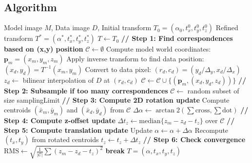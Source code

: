 \documentclass[11pt,a4paper]{article}
\begin{document}
\subsection{Algorithm}

\begin{algorithm}[H]
\caption{2.5D Iterative Refinement}
\begin{algorithmic}[1]
\Require Model image $M$, Data image $D$, Initial transform $T_0 = (\alpha_0, t_x^0, t_y^0, t_z^0)$
\Ensure Refined transform $T^* = (\alpha^*, t_x^*, t_y^*, t_z^*)$
\State $T \gets T_0$
    \State \textbf{// Step 1: Find correspondences based on (x,y) position}
    \State $\mathcal{C} \gets \emptyset$
        \State Compute model world coordinates: $\mathbf{p}_m = (x_m, y_m, z_m)$
        \State Apply inverse transform to find data position: $(x_d, y_d) = T^{-1}(x_m, y_m)$
        \State Convert to data pixel: $(r_d, c_d) = (y_d/\Delta_y, x_d/\Delta_x)$
            \State $z_d \gets$ bilinear interpolation of $D$ at $(r_d, c_d)$
            \State $\mathcal{C} \gets \mathcal{C} \cup \{(\mathbf{p}_m, (x_d, y_d, z_d))\}$
        \EndIf
    \EndFor
    \State
    \State \textbf{// Step 2: Subsample if too many correspondences}
        \State $\mathcal{C} \gets$ random subset of size samplingLimit
    \EndIf
    \State
    \State \textbf{// Step 3: Compute 2D rotation update}
    \State Compute centroids $(\bar{x}_m, \bar{y}_m)$ and $(\bar{x}_d, \bar{y}_d)$ from $\mathcal{C}$
    \State $\Delta\alpha \gets \arctan2(\sum \text{cross}, \sum \text{dot})$ 
    \State
    \State \textbf{// Step 4: Compute z-offset update}
    \State $\Delta t_z \gets \text{median}\{z_m - z_d - t_z\}$ over $\mathcal{C}$
    \State
    \State \textbf{// Step 5: Compute translation update}
    \State Update $\alpha \gets \alpha + \Delta\alpha$
    \State Recompute $(t_x, t_y)$ from rotated centroids
    \State $t_z \gets t_z + \Delta t_z$
    \State
    \State \textbf{// Step 6: Check convergence}
    \State $\text{RMS} \gets \sqrt{\frac{1}{|\mathcal{C}|}\sum (z_m - z_d - t_z)^2}$
        \State \textbf{break} 
    \EndIf
\EndFor
\State \Return $T = (\alpha, t_x, t_y, t_z)$
\end{algorithmic}
\end{algorithm}
\end{document}
